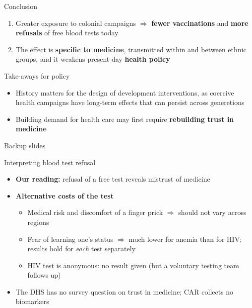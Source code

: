 \documentclass[aspectratio=1610]{beamer}
\newcommand{\highlight}[1]{\textcolor{accent}{\textbf{#1}}}
\newcommand{\returnbutton}[1]{\par\vfill\hfill\hyperlink{#1}{\beamerreturnbutton{Back}}}
\begin{document}
\begin{frame}{Conclusion}
  \begin{enumerate}
    \item Greater exposure to colonial campaigns $\Rightarrow$ \textbf{fewer vaccinations} and \textbf{more refusals}
      of free blood tests today
    \item The effect is \textbf{specific to medicine}, transmitted within and between ethnic groups, and it weakens
      present-day \textbf{health policy}
  \end{enumerate}
  \vspace{0.6em}
  \begin{block}{Take-aways for policy}
    \begin{itemize}
      \item History matters for the design of development interventions, as coercive health campaigns have long-term effects that can persist across generetions
      \item Building demand for health care may first require \highlight{rebuilding trust in medicine}
    \end{itemize}
  \end{block}
\end{frame}

\appendix
\backupslidestrue

\begin{frame}[plain]
  \centering
  \vfill
  {\Huge Backup slides}
  \vfill
\end{frame}

\begin{frame}[label=bk-interpretation]{Interpreting blood test refusal}
  \begin{itemize}
    \item \textbf{Our reading:} refusal of a free test reveals mistrust of medicine
    \item \textbf{Alternative costs of the test}
      \begin{itemize}
        \item Medical risk and discomfort of a finger prick $\Rightarrow$ should not vary across regions
        \item Fear of learning one's status $\Rightarrow$ much lower for anemia than for HIV;
          results hold for \emph{each} test separately
        \item HIV test is anonymous: no result given (but a voluntary testing team follows up)
      \end{itemize}
    \item The DHS has no survey question on trust in medicine; CAR collects no biomarkers
  \end{itemize}
  \returnbutton{main-outcomes}
\end{frame}
\end{document}
